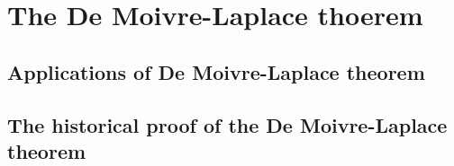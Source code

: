 \chapter{The De Moivre-Laplace thoerem}

\section{Applications of De Moivre-Laplace theorem}

\section{The historical proof of the De Moivre-Laplace theorem}
